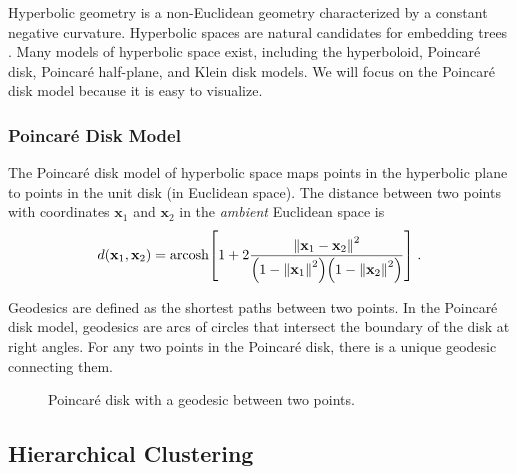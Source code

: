 \documentclass{article}
\begin{document}
Hyperbolic geometry is a non-Euclidean geometry characterized by a constant negative curvature. Hyperbolic spaces are natural candidates for embedding trees \cite{sarkar2011low}. Many models of hyperbolic space exist, including the hyperboloid, Poincaré disk, Poincaré half-plane, and Klein disk models. We will focus on the Poincaré disk model because it is easy to visualize.

\subsubsection{Poincaré Disk Model}

The Poincaré disk model of hyperbolic space maps points in the hyperbolic plane to points in the unit disk (in Euclidean space). The distance between two points with coordinates $\mathbf x_1$ and $\mathbf x_2$ in the \emph{ambient} Euclidean space is
\begin{align}
  d(\mathbf x_1, \mathbf x_2)
  = \text{arcosh} \qty[1 + 2 \frac{\norm{\mathbf x_1 - \mathbf x_2}^2}{\qty(1 - \norm{\mathbf x_1}^2) \qty(1 - \norm{\mathbf x_2}^2)}] \; . \label{eq:poincare-distance}
\end{align}

Geodesics are defined as the shortest paths between two points. In the Poincaré disk model, geodesics are arcs of circles that intersect the boundary of the disk at right angles. For any two points in the Poincaré disk, there is a unique geodesic connecting them.

\begin{figure}[ht]
  \centering
  \caption{Poincaré disk with a geodesic between two points.}
  \label{fig:poincare-disk}
\end{figure}

\subsection{Hierarchical Clustering}

\end{document}
